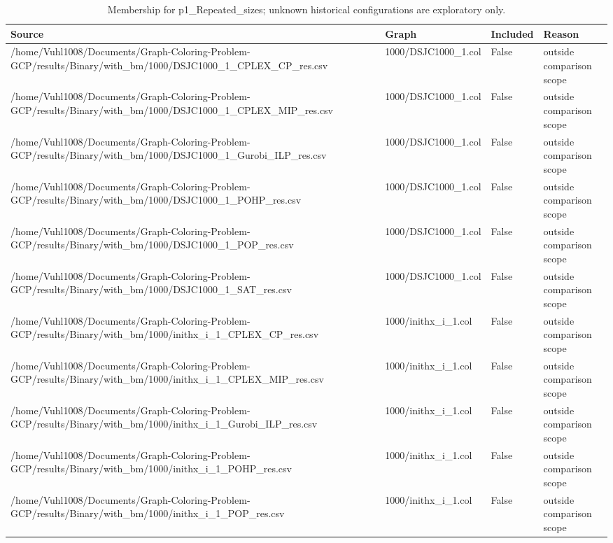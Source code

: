 \begin{table}[htbp]
\centering
\caption{Membership for p1\_Repeated\_sizes; unknown historical configurations are exploratory only.}
\label{tab:p1-Repeated-sizes-membership}
\begin{tabular}{llll}
\hline
Source & Graph & Included & Reason \\
\hline
/home/Vuhl1008/Documents/Graph-Coloring-Problem-GCP/results/Binary/with\_bm/1000/DSJC1000\_1\_CPLEX\_CP\_res.csv & 1000/DSJC1000\_1.col & False & outside comparison scope \\
/home/Vuhl1008/Documents/Graph-Coloring-Problem-GCP/results/Binary/with\_bm/1000/DSJC1000\_1\_CPLEX\_MIP\_res.csv & 1000/DSJC1000\_1.col & False & outside comparison scope \\
/home/Vuhl1008/Documents/Graph-Coloring-Problem-GCP/results/Binary/with\_bm/1000/DSJC1000\_1\_Gurobi\_ILP\_res.csv & 1000/DSJC1000\_1.col & False & outside comparison scope \\
/home/Vuhl1008/Documents/Graph-Coloring-Problem-GCP/results/Binary/with\_bm/1000/DSJC1000\_1\_POHP\_res.csv & 1000/DSJC1000\_1.col & False & outside comparison scope \\
/home/Vuhl1008/Documents/Graph-Coloring-Problem-GCP/results/Binary/with\_bm/1000/DSJC1000\_1\_POP\_res.csv & 1000/DSJC1000\_1.col & False & outside comparison scope \\
/home/Vuhl1008/Documents/Graph-Coloring-Problem-GCP/results/Binary/with\_bm/1000/DSJC1000\_1\_SAT\_res.csv & 1000/DSJC1000\_1.col & False & outside comparison scope \\
/home/Vuhl1008/Documents/Graph-Coloring-Problem-GCP/results/Binary/with\_bm/1000/inithx\_i\_1\_CPLEX\_CP\_res.csv & 1000/inithx\_i\_1.col & False & outside comparison scope \\
/home/Vuhl1008/Documents/Graph-Coloring-Problem-GCP/results/Binary/with\_bm/1000/inithx\_i\_1\_CPLEX\_MIP\_res.csv & 1000/inithx\_i\_1.col & False & outside comparison scope \\
/home/Vuhl1008/Documents/Graph-Coloring-Problem-GCP/results/Binary/with\_bm/1000/inithx\_i\_1\_Gurobi\_ILP\_res.csv & 1000/inithx\_i\_1.col & False & outside comparison scope \\
/home/Vuhl1008/Documents/Graph-Coloring-Problem-GCP/results/Binary/with\_bm/1000/inithx\_i\_1\_POHP\_res.csv & 1000/inithx\_i\_1.col & False & outside comparison scope \\
/home/Vuhl1008/Documents/Graph-Coloring-Problem-GCP/results/Binary/with\_bm/1000/inithx\_i\_1\_POP\_res.csv & 1000/inithx\_i\_1.col & False & outside comparison scope \\

\end{tabular}
\end{table}
